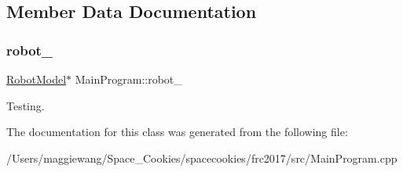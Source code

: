 \subsection{Member Data Documentation}
\mbox{\label{class_main_program_a2d74d25ebc0a0bc52daa34a0048e071d}} 
\subsubsection{\texorpdfstring{robot\+\_\+}{robot\_}}
{\footnotesize\ttfamily \hyperlink{class_robot_model}{Robot\+Model}$\ast$ Main\+Program\+::robot\+\_\+\hspace{0.3cm}{\ttfamily [private]}}

Testing. 

The documentation for this class was generated from the following file\+:\begin{DoxyCompactItemize}
\item 
/\+Users/maggiewang/\+Space\+\_\+\+Cookies/spacecookies/frc2017/src/Main\+Program.\+cpp\end{DoxyCompactItemize}
